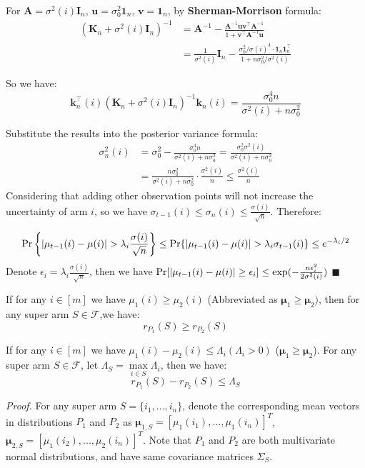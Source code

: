 \documentclass[opre,sglanonrev]{informs4}
\begin{document}
For $\mathbf{A} = \sigma^2(i)\mathbf{I}_n$, $\mathbf{u} = \sigma_0^2\mathbf{1}_n$, $\mathbf{v} = \mathbf{1}_n$, by \textbf{Sherman-Morrison} formula:
\begin{equation*}
\begin{aligned}
(\mathbf{K}_n + \sigma^2(i)\mathbf{I}_n)^{-1} &= \mathbf{A}^{-1} - \frac{\mathbf{A}^{-1}\mathbf{u}\mathbf{v}^\top\mathbf{A}^{-1}}{1 + \mathbf{v}^\top\mathbf{A}^{-1}\mathbf{u}} \\
&= \frac{1}{\sigma^2(i)}\mathbf{I}_n - \frac{\sigma_0^2/\sigma(i)^4 \cdot \mathbf{1}_n\mathbf{1}_n^\top}{1 + n\sigma_0^2/\sigma^2(i)}
\end{aligned}
\end{equation*} 

So we have:
\[
\mathbf{k}_n^\top(i)(\mathbf{K}_n + \sigma^2(i)\mathbf{I}_n)^{-1}\mathbf{k}_n(i) = \frac{\sigma_0^4n}{\sigma^2(i) + n\sigma_0^2}
\]

Substitute the results into the posterior variance formula:
\begin{equation*}
\begin{aligned}
\sigma_n^2(i) &= \sigma_0^2 - \frac{\sigma_0^4n}{\sigma^2(i) + n\sigma_0^2} = \frac{\sigma_0^2\sigma^2(i)}{\sigma^2(i) + n\sigma_0^2} \\
&= \frac{n\sigma_0^2}{\sigma^2(i)+n\sigma_0^2}\cdot \frac{\sigma^2(i)}{n} \leq \frac{\sigma^2(i)}{n}
\end{aligned}
\end{equation*} 
Considering that adding other observation points will not increase the uncertainty of arm $i$, so we have $\sigma_{t-1}(i) \leq \sigma_n(i) \leq \frac{\sigma(i)}{\sqrt{n}}$. Therefore:

$$\textnormal{Pr}\left\{|\mu_{t-1}(i)-\mu(i)|>\lambda_i \frac{\sigma(i)}{\sqrt{n}}\right\}\leq\textnormal{Pr}\{|\mu_{t-1}(i)-\mu(i)|>\lambda_i \sigma_{t-1}(i)\}\leq e^{-\lambda_i/2}$$
Denote $\epsilon_i = \lambda_i \frac{\sigma(i)}{\sqrt{n}}$, then we have $\textnormal{Pr}[|\mu_{t-1}(i)-\mu(i)|\geq \epsilon_i]\leq \exp(-\frac{n\epsilon_i^2}{2\sigma^2(i)})$  \hfill $\blacksquare$

\begin{lemma}
If for any $i \in [m]$ we have $\mu_1(i) \geq \mu_2(i)$ (Abbreviated as $\boldsymbol{\mu}_1 \geq \boldsymbol{\mu}_2)$, then for any super arm $S \in \mathcal{F}$,we have:
$$
r_{P_1}(S) \geq r_{P_2}(S)
$$	
\end{lemma}

\begin{lemma}
If for any $i \in [m]$ we have $\mu_1(i) - \mu_2(i) \leq \Lambda_i (\Lambda_i>0)$ ($\boldsymbol{\mu}_1 \geq \boldsymbol{\mu}_2$). For any super arm $S \in \mathcal{F}$, let $\Lambda_S = \mathop{\max}\limits_{i\in S}\Lambda_i$, then we have:
$$
r_{P_1}(S) - r_{P_2}(S) \leq \Lambda_S
$$
\end{lemma}
\textit{Proof.} For any super arm $S = \{i_1,...,i_n\}$, denote the corresponding mean vectors in distributions $P_1$ and $P_2$ as $\boldsymbol{\mu}_{1,S} = [\mu_1(i_1),...,\mu_1(i_n)]^T$, $\boldsymbol{\mu}_{2,S} = [\mu_1(i_2),...,\mu_2(i_n)]^T$. Note that $P_1$ and $P_2$ are both multivariate normal distributions, and have same covariance matrices $\Sigma_S$.
\end{document}
